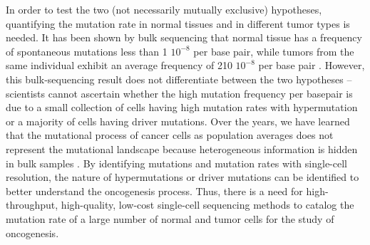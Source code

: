 In order to test the two (not necessarily mutually exclusive) hypotheses, quantifying the mutation rate in normal tissues and in different tumor types is needed. It has been shown by bulk sequencing that normal tissue has a frequency of spontaneous mutations less than 1 \times $10^{-8}$ per base pair, while tumors from the same individual exhibit an average frequency of 210 \times $10^{-8}$ per base pair \cite{Bielas:2006cj}. However, this bulk-sequencing result does not differentiate between the two hypotheses -- scientists cannot ascertain whether the high mutation frequency per basepair is due to a small collection of cells having high mutation rates with hypermutation or a majority of cells having driver mutations. Over the years, we have learned that the mutational process of cancer cells as population averages does not represent the mutational landscape because heterogeneous information is hidden in bulk samples \cite{Navin:2011jq,Zong:2012bs,Li:2011uq}. By identifying mutations and mutation rates with single-cell resolution, the nature of hypermutations or driver mutations can be identified to better understand the oncogenesis process. Thus, there is a need for high-throughput, high-quality, low-cost single-cell sequencing methods to catalog the mutation rate of a large number of normal and tumor cells for the study of oncogenesis. 

